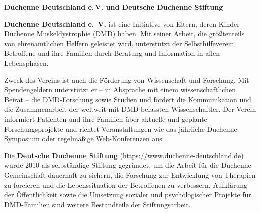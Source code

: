 \documentclass[fontsize=14pt,a4paper,headinclude,DIV=calc,automark]{scrbook}
\begin{document}
\begin{tcolorbox}[
    enhanced,
    breakable,
    colframe=rahmenlinie,      %
    colback=white,             %
    left=12pt, right=12pt,     %
    top=12pt, bottom=12pt,     %
    boxrule=0.3pt,             %
    arc=8pt                    %
]
\small\sffamily
\setlength{\parindent}{0pt} %

\textbf{Duchenne Deutschland e.\,V. und Deutsche Duchenne Stiftung}

\vspace{0.5\baselineskip}

\textbf{Duchenne Deutschland e.~V.} ist eine Initiative von Eltern, deren Kinder Duchenne Muskeldystrophie (DMD) haben. Mit seiner Arbeit, die größtenteils von ehrenamtlichen Helfern geleistet wird, unterstützt der Selbsthilfeverein Betroffene und ihre Familien durch Beratung und Information in allen Lebensphasen.

\vspace{0.8\baselineskip}

Zweck des Vereins ist auch die Förderung von Wissenschaft und Forschung. Mit Spendengeldern unterstützt er – in Absprache mit einem wissenschaftlichen Beirat – die DMD-Forschung sowie Studien und fördert die Kommunikation und die Zusammenarbeit der weltweit mit DMD befassten Wissenschaftler. Der Verein informiert Patienten und ihre Familien über aktuelle und geplante Forschungsprojekte und richtet Veranstaltungen wie das jährliche Duchenne-Symposium oder regelmäßige Web-Konferenzen aus.

\vspace{0.8\baselineskip}

Die \textbf{Deutsche Duchenne Stiftung} (\url{https://www.duchenne-deutschland.de}) wurde 2010 als selbständige Stiftung gegründet, um die Arbeit für die Duchenne-Gemeinschaft dauerhaft zu sichern, die Forschung zur Entwicklung von Therapien zu forcieren und die Lebenssituation der Betroffenen zu verbessern. Aufklärung der Öffentlichkeit sowie die Umsetzung sozialer und psychologischer Projekte für DMD-Familien sind weitere Bestandteile der Stiftungsarbeit.


\end{tcolorbox}
\end{document}
